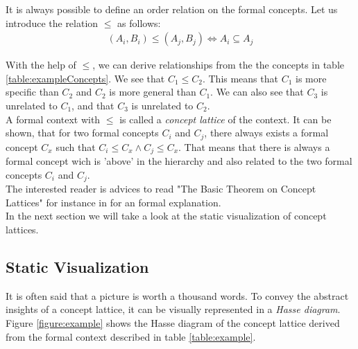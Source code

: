 \documentclass[11pt]{report}
\begin{document}
It is always possible to define an order relation on the formal concepts. Let us introduce the relation $\le$ as follows:
\begin{align*} (A_i,B_i) \le (A_j, B_j) \Longleftrightarrow	A_i \subseteq A_j
\end{align*}

With the help of $\le$, we  can derive relationships from the the concepts in table \ref{table:exampleConcepts}. We see that $C_1 \le C_2$. This means that $C_1$ is more specific than $C_2$ and $C_2$ is more general than $C_1$. We can also see that $C_3$ is unrelated to $C_1$, and that $C_3$ is unrelated to $C_2$. \\

A formal context with $\le$ is called a \textit{concept lattice} of the context. It can be shown, that for two formal concepts $C_i$ and $C_j$, there always exists a formal concept $C_x$ such that $C_i \le C_x \wedge C_j \le C_x$. That means that there is always a formal concept wich is 'above' in the hierarchy and also related to the two formal concepts $C_i$ and $C_j$. \\ 

The interested reader is advices to read "The Basic Theorem on Concept Lattices" for instance in \cite{carpineto2004concept} for an formal explanation. \\

In the next section we will take a look at the static visualization of concept lattices.

\subsection{Static Visualization}

It is often said that a picture is worth a thousand words. To convey the abstract insights of a concept lattice, it can be visually represented in a \textit{Hasse diagram}. Figure \ref{figure:example} shows the Hasse diagram of the concept lattice derived from the formal context described in table \ref{table:example}. \\
\end{document}
